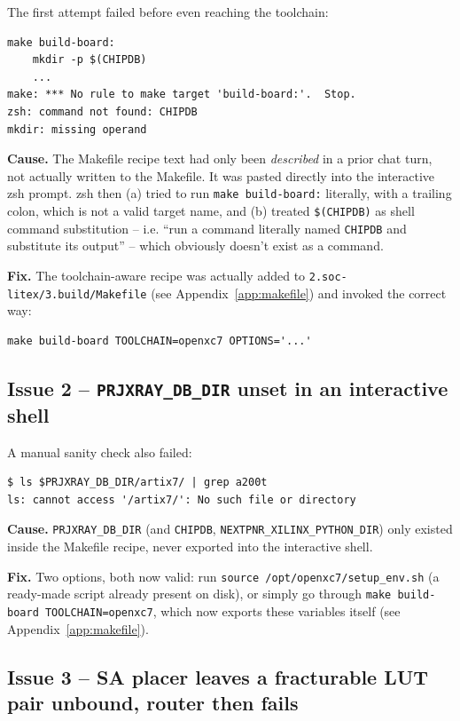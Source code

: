 \documentclass[11pt]{article}
\begin{document}
The first attempt failed before even reaching the toolchain:

\begin{lstlisting}[style=termout]
make build-board:
    mkdir -p $(CHIPDB)
    ...
make: *** No rule to make target 'build-board:'.  Stop.
zsh: command not found: CHIPDB
mkdir: missing operand
\end{lstlisting}

\textbf{Cause.} The Makefile recipe text had only been \emph{described}
in a prior chat turn, not actually written to the Makefile. It was pasted
directly into the interactive zsh prompt. zsh then (a) tried to run
\lstinline{make build-board:} literally, with a trailing colon, which is
not a valid target name, and (b) treated \lstinline{$(CHIPDB)} as shell
command substitution -- i.e. ``run a command literally named
\lstinline{CHIPDB} and substitute its output'' -- which obviously doesn't
exist as a command.

\textbf{Fix.} The toolchain-aware recipe was actually added to
\lstinline{2.soc-litex/3.build/Makefile} (see Appendix~\ref{app:makefile})
and invoked the correct way:
\begin{lstlisting}[style=termout]
make build-board TOOLCHAIN=openxc7 OPTIONS='...'
\end{lstlisting}

\subsection{Issue 2 -- \texttt{PRJXRAY\_DB\_DIR} unset in an interactive
shell}

A manual sanity check also failed:
\begin{lstlisting}[style=termout]
$ ls $PRJXRAY_DB_DIR/artix7/ | grep a200t
ls: cannot access '/artix7/': No such file or directory
\end{lstlisting}

\textbf{Cause.} \lstinline{PRJXRAY_DB_DIR} (and \lstinline{CHIPDB},
\lstinline{NEXTPNR_XILINX_PYTHON_DIR}) only existed inside the Makefile
recipe, never exported into the interactive shell.

\textbf{Fix.} Two options, both now valid: run
\lstinline{source /opt/openxc7/setup_env.sh} (a ready-made script already
present on disk), or simply go through \lstinline{make build-board TOOLCHAIN=openxc7}, which now exports these variables itself (see
Appendix~\ref{app:makefile}).

\subsection{Issue 3 -- SA placer leaves a fracturable LUT pair unbound,
router then fails}
\end{document}

